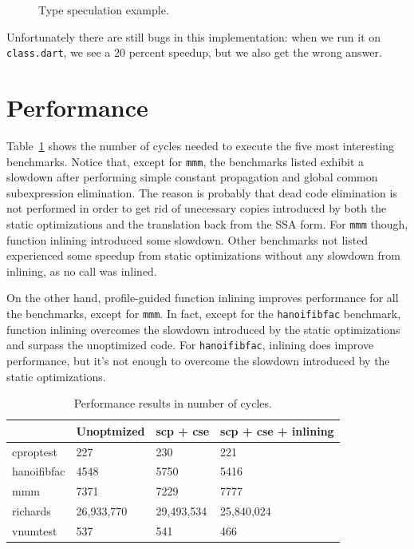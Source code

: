 \documentclass[10pt,twocolumn]{article}
\begin{document}
\begin{figure}
\begin{center}
\begin{minipage}{0.95\columnwidth}
  \caption{\label{fig:hammock} Type speculation example.}
\end{minipage}
\end{center}
\end{figure}

Unfortunately there are still bugs in this implementation: when we run
it on \texttt{class.dart}, we see a 20 percent speedup, but we also get the
wrong answer.

\section{Performance}

Table~\ref{results} shows the number of cycles needed to execute the five
most interesting benchmarks. Notice that, except for \texttt{mmm}, the benchmarks listed exhibit a slowdown
after performing simple constant propagation and global common subexpression elimination.
The reason is probably that dead code elimination is not performed in order
to get rid of unecessary copies introduced by both the static optimizations and the translation
back from the SSA form. For \texttt{mmm} though, function inlining introduced some slowdown.
Other benchmarks not listed experienced some speedup from static optimizations without any
slowdown from inlining, as no call was inlined.

On the other hand, profile-guided function inlining improves performance for all the benchmarks, except for \texttt{mmm}.
In fact, except for the \texttt{hanoifibfac} benchmark, function inlining overcomes the slowdown
introduced by the static optimizations and surpass the unoptimized code. For \texttt{hanoifibfac}, inlining does improve
performance, but it's not enough to overcome the slowdown introduced by the static optimizations.

\begin{table}[b]
\begin{tabular}{|l|l|l|l|} \hline
~           & \textbf{Unoptmized} & \textbf{scp + cse}  & \textbf{scp + cse + inlining} \\ \hline
cproptest   & 227        & 230        & 221                  \\ \hline
hanoifibfac & 4548       & 5750       & 5416                 \\ \hline
mmm         & 7371       & 7229       & 7777                 \\ \hline
richards    & 26,933,770 & 29,493,534 & 25,840,024           \\ \hline
vnumtest    & 537        & 541        & 466                  \\ \hline
\end{tabular}
\caption{Performance results in number of cycles.}
\label{results}
\end{table}
\end{document}
